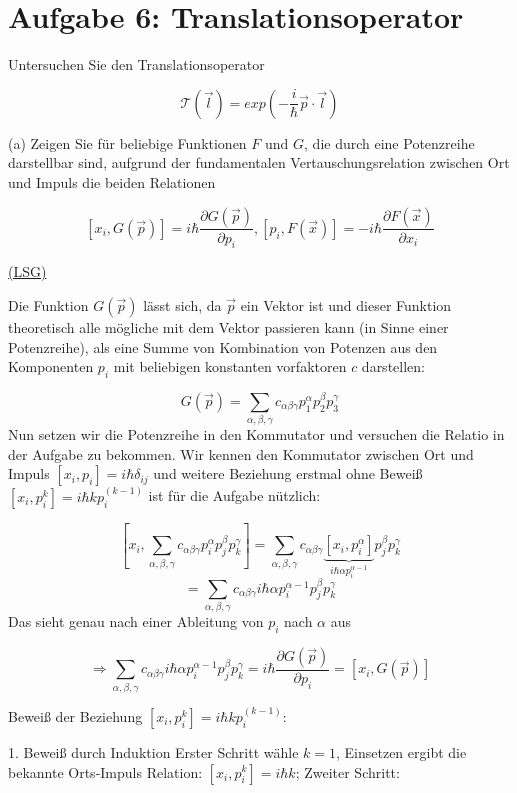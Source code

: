 


\section*{Aufgabe 6: Translationsoperator}

Untersuchen Sie den Translationsoperator

$$ \mathcal T(\vec l) = exp\left( -\frac i \hbar \vec p\cdot \vec l
\right) $$

(a) Zeigen Sie für beliebige Funktionen $F$ und $G$, die durch eine
Potenzreihe darstellbar sind, aufgrund der fundamentalen
Vertauschungsrelation zwischen Ort und Impuls die beiden Relationen

$$ [x_i, G(\vec p)]=i\hbar \frac{\partial G(\vec p)}{\partial p_i}, [p_i,F(\vec x)] = -i\hbar \frac{\partial F(\vec
  x)}{\partial x_i} $$

\underline{(LSG)}

Die Funktion $G(\vec p)$ lässt sich, da $\vec p$ ein Vektor ist und
dieser Funktion theoretisch alle mögliche mit dem Vektor passieren
kann (in Sinne einer Potenzreihe),  als
eine Summe von Kombination von Potenzen aus den Komponenten $p_i$ mit
beliebigen konstanten vorfaktoren $c$ darstellen:

$$  G(\vec p) = \sum_{\alpha,\beta,\gamma}
c_{\alpha\beta\gamma}p^\alpha_1 p^\beta_2 p^\gamma_3$$
Nun setzen wir die Potenzreihe in den Kommutator und versuchen die
Relatio in der Aufgabe zu bekommen. Wir kennen den Kommutator
zwischen Ort und Impuls $[x_i,p_i]=i\hbar\delta_{ij}$ und weitere
Beziehung erstmal ohne Beweiß $[x_i,p_i^k]=i\hbar k p_i^{(k-1)}$ ist für
die Aufgabe nützlich:

$$ [x_i,\sum_{\alpha,\beta,\gamma}
c_{\alpha\beta\gamma}p^\alpha_i p^\beta_j p^\gamma_k] = \sum_{\alpha,\beta,\gamma}
c_{\alpha\beta\gamma}\underbrace{[x_i,p^\alpha_i]}_{i\hbar \alpha
  p^{\alpha-1}_i} p^\beta_j p^\gamma_k$$
$$=  \sum_{\alpha,\beta,\gamma}
c_{\alpha\beta\gamma}i\hbar \alpha p^{\alpha-1}_i p^\beta_j
p^\gamma_k$$
Das sieht genau nach einer Ableitung von $p_i$ nach $\alpha$ aus

$$\Rightarrow \sum_{\alpha,\beta,\gamma}
c_{\alpha\beta\gamma}i\hbar \alpha p^{\alpha-1}_i p^\beta_j
p^\gamma_k =i\hbar \frac{\partial G(\vec p)}{\partial p_i} =  [x_i,
G(\vec p)]$$

Beweiß der Beziehung $[x_i,p_i^k]=i\hbar k p_i^{(k-1)}$:

1. Beweiß durch Induktion
Erster Schritt wähle $k=1$, Einsetzen ergibt die bekannte Orts-Impuls Relation:
$[x_i,p_i^k]=i\hbar k$;  Zweiter Schritt:

